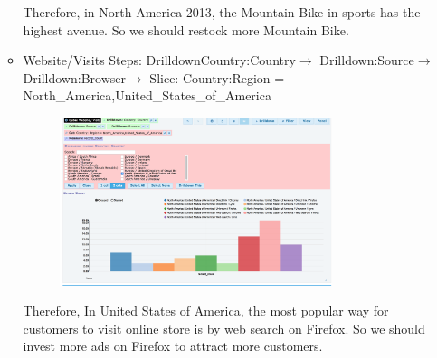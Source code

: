 \begin{enumerate}
\begin{itemize}
Therefore, in North America 2013, the Mountain Bike in sports has the highest avenue. So we should restock more Mountain Bike.


\item Website/Visits
Steps: DrilldownCountry:Country$\rightarrow$
Drilldown:Source$\rightarrow$
Drilldown:Browser$\rightarrow$
Slice: Country:Region = {North\_America,United\_States\_of\_America}


\begin{figure}[H]
\includegraphics[width=0.8\textwidth]{Figures/d2.png}
\centering
\end{figure}

Therefore, In United States of America, the most popular way for customers to visit online store is by web search on Firefox. So we should invest more ads on Firefox to attract more customers. 

\end{itemize}

\end{enumerate}


